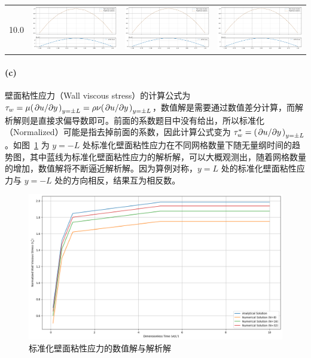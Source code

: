 \begin{landscape}
\begin{table}[h]
\begin{tabular}{c|ccc}
                   10.0 & \includegraphics[height=0.23\textwidth]{figure/2/8-10.0.png} & \includegraphics[height=0.23\textwidth]{figure/2/16-10.0.png} & \includegraphics[height=0.23\textwidth]{figure/2/32-10.0.png}
        \end{tabular}
    \end{table}
\end{landscape}

\paragraph{(c)}
壁面粘性应力（Wall viscous stress）的计算公式为 $\tau_w=\mu\qty(\pdv*{u}{y})_{y=\pm L}=\rho\nu\qty(\pdv*{u}{y})_{y=\pm L}$，数值解是需要通过数值差分计算，而解析解则是直接求偏导数即可。前面的系数题目中没有给出，所以标准化（Normalized）可能是指去掉前面的系数，因此计算公式变为 $\tau^*_w=\qty(\pdv*{u}{y})_{y=\pm L}$。如图~\ref{F:2-2-4} 为 $y=-L$ 处标准化壁面粘性应力在不同网格数量下随无量纲时间的趋势图，其中蓝线为标准化壁面粘性应力的解析解，可以大概观测出，随着网格数量的增加，数值解将不断逼近解析解。因为算例对称，$y=L$ 处的标准化壁面粘性应力与 $y=-L$ 处的方向相反，结果互为相反数。

\begin{figure}[H]
    \centering
    \includegraphics[width=.75\textwidth]{figure/2/normalized_wall_viscous_stress.png}
    \caption{标准化壁面粘性应力的数值解与解析解}\label{F:2-2-4}
\end{figure}

